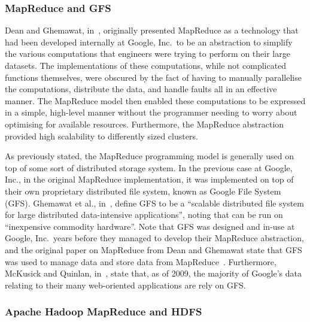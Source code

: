 \documentclass[a4paper,11pt]{article}
\begin{document}
\subsubsection{MapReduce and GFS} %
\label{ssub:mapreduce_and_gfs}

Dean and Ghemawat, in~\cite{dean_mapreduce:_2008}, originally presented MapReduce as a technology that had been
developed internally at Google, Inc.\ to be an abstraction to simplify the various computations that engineers were
trying to perform on their large datasets. The implementations of these computations, while not complicated functions
themselves, were obscured by the fact of having to manually parallelise the computations, distribute the data, and
handle faults all in an effective manner. The MapReduce model then enabled these computations to be expressed in a
simple, high-level manner without the programmer needing to worry about optimising for available resources. Furthermore,
the MapReduce abstraction provided high scalability to differently sized clusters.

As previously stated, the MapReduce programming model is generally used on top of some sort of distributed storage
system. In the previous case at Google, Inc., in the original MapReduce implementation, it was implemented on top of
their own proprietary distributed file system, known as Google File System (GFS). Ghemawat et al.,
in~\cite{ghemawat_google_2003}, define GFS to be a ``scalable distributed file system for large distributed data-intensive
applications'', noting that can be run on ``inexpensive commodity hardware''. Note that GFS was designed and in-use
at Google, Inc.\ years before they managed to develop their MapReduce abstraction, and the original paper on MapReduce
from Dean and Ghemawat state that GFS was used to manage data and store data from MapReduce~\cite{dean_mapreduce:_2008}.
Furthermore, McKusick and Quinlan, in~\cite{mckusick2009gfs}, state that, as of 2009, the majority of Google's data
relating to their many web-oriented applications are rely on GFS.



\subsubsection{Apache Hadoop MapReduce and HDFS} %
\label{ssub:hadoop_mapreduce_and_hdfs}
\end{document}
